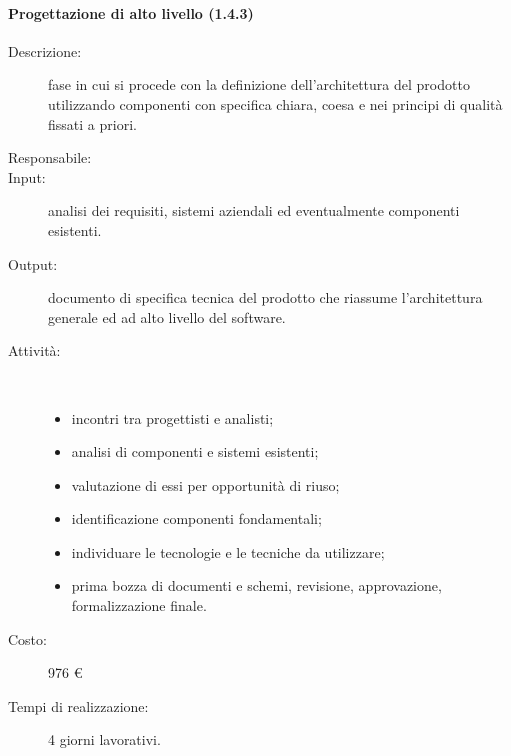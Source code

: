 \begin{description}
\paragraph{Progettazione di alto livello (1.4.3)}
\begin{description}
\item[Descrizione:] fase in cui si procede con la definizione dell'architettura del prodotto utilizzando componenti con
specifica chiara, coesa e nei principi di qualit\`{a} fissati a priori.
\item[Responsabile:] 
\item[Input:] analisi dei requisiti, sistemi aziendali ed eventualmente componenti esistenti.
\item[Output:] documento di specifica tecnica del prodotto che riassume l'architettura generale ed ad
alto livello del software.
\item[Attività:]\mbox{}\\[-1.5\baselineskip]
	\begin{itemize}
	\item incontri tra progettisti e analisti;
	\item analisi di componenti e sistemi esistenti;
	\item valutazione di essi per opportunità di riuso;
	\item identificazione componenti fondamentali;
	\item individuare le tecnologie e le tecniche da utilizzare;
	\item prima bozza di documenti e schemi, revisione, approvazione, formalizzazione finale.
	\end{itemize}
\item[Costo:] 976 \euro{}
\item[Tempi di realizzazione:] 4 giorni lavorativi.
\end{description}


\end{description}
